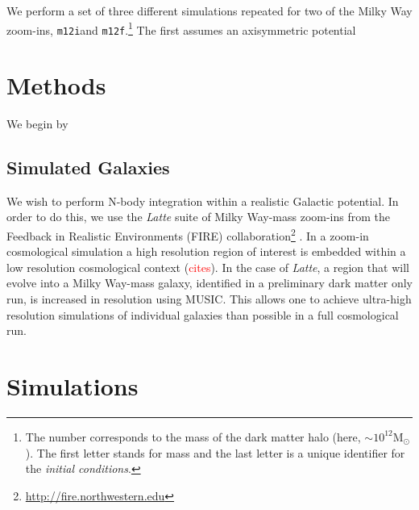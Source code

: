 \documentclass[twocolumn]{aastex62}
\newcommand{\Gus}[1]{\textcolor{red}{#1}}
\newcommand{\Msun}{\text{M}_\odot}
\newcommand{\mi}{\texttt{m12i}}
\newcommand{\mf}{\texttt{m12f}}
\begin{document}
We perform a set of three different simulations repeated for two of the Milky Way zoom-ins, \mi and \mf.\footnote{The number corresponds to the mass of the dark matter halo (here, $\sim 10^{12} \Msun$). The first letter stands for mass and the last letter is a unique identifier for the {\em initial conditions}.} The first assumes an axisymmetric potential 


\section{Methods} \label{sec:methods}
We begin by 

\subsection{Simulated Galaxies} \label{ssec:fire}
We wish to perform N-body integration within a realistic Galactic potential. In order to do this, we use the {\em Latte} suite of Milky Way-mass zoom-ins from the Feedback in Realistic Environments (FIRE) collaboration\footnote{\url{http://fire.northwestern.edu}} \citep{2016ApJ...827L..23W,2018MNRAS.480..800H}. In a zoom-in cosmological simulation a high resolution region of interest is embedded within a low resolution cosmological context (\Gus{cites}). In the case of {\em Latte}, a region that will evolve into a Milky Way-mass galaxy, identified in a preliminary dark matter only run, is increased in resolution using MUSIC. This allows one to achieve ultra-high resolution simulations of individual galaxies than possible in a full cosmological run.



\section{Simulations}


\end{document}
